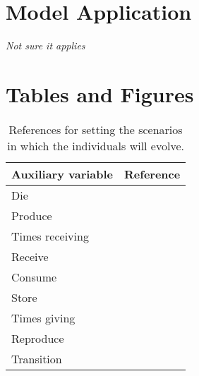 \documentclass{article}
\begin{document}
\section{Model Application}

\emph{Not sure it applies}

\section{Tables and Figures}

\begin{table}[h!]
    \centering
    \begin{tabular}{ l r }
    \hline
    Auxiliary variable & Reference \\ 
    \hline
    Die & \cite{gurven2007longevity} \\  
    Produce & \cite{koster2020life} \\  
    Times receiving & \cite{gurven2004give} \\  
    Receive & \cite{gurven2004give} \\  
    Consume & \cite{kaplan2000theory} \\  
    Store & \cite{bowles2011cultivation} \\  
    Times giving & \cite{gurven2004give} \\  
    Reproduce & \cite{wood2017dynamics} \\  
    Transition & \cite{ellison2017reproductive,wood2017dynamics} \\
    \hline
    \end{tabular}
    \caption{References for setting the scenarios in which the individuals will evolve.}
    \label{tab:1}
\end{table}
\end{document}
